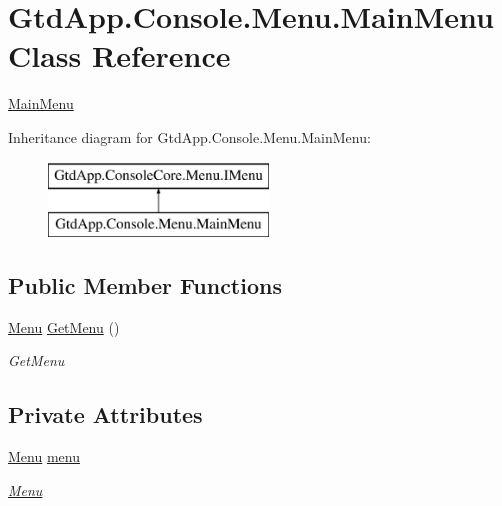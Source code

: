 \hypertarget{class_gtd_app_1_1_console_1_1_menu_1_1_main_menu}{}\section{Gtd\+App.\+Console.\+Menu.\+Main\+Menu Class Reference}
\label{class_gtd_app_1_1_console_1_1_menu_1_1_main_menu}


\mbox{\hyperlink{class_gtd_app_1_1_console_1_1_menu_1_1_main_menu}{Main\+Menu}}  


Inheritance diagram for Gtd\+App.\+Console.\+Menu.\+Main\+Menu\+:\begin{figure}[H]
\begin{center}
\leavevmode
\includegraphics[height=2.000000cm]{class_gtd_app_1_1_console_1_1_menu_1_1_main_menu}
\end{center}
\end{figure}
\subsection*{Public Member Functions}
\begin{DoxyCompactItemize}
\item 
\mbox{\hyperlink{class_gtd_app_1_1_console_core_1_1_menu_1_1_menu}{Menu}} \mbox{\hyperlink{class_gtd_app_1_1_console_1_1_menu_1_1_main_menu_a1b91b88838b55c7d929ac2d41ec97643}{Get\+Menu}} ()
\begin{DoxyCompactList}\small\item\em Get\+Menu \end{DoxyCompactList}\end{DoxyCompactItemize}
\subsection*{Private Attributes}
\begin{DoxyCompactItemize}
\item 
\mbox{\hyperlink{class_gtd_app_1_1_console_core_1_1_menu_1_1_menu}{Menu}} \mbox{\hyperlink{class_gtd_app_1_1_console_1_1_menu_1_1_main_menu_a14921f59e9b211ffe3eb79a48e150bcb}{menu}}
\begin{DoxyCompactList}\small\item\em \mbox{\hyperlink{namespace_gtd_app_1_1_console_1_1_menu}{Menu}} \end{DoxyCompactList}\end{DoxyCompactItemize}


